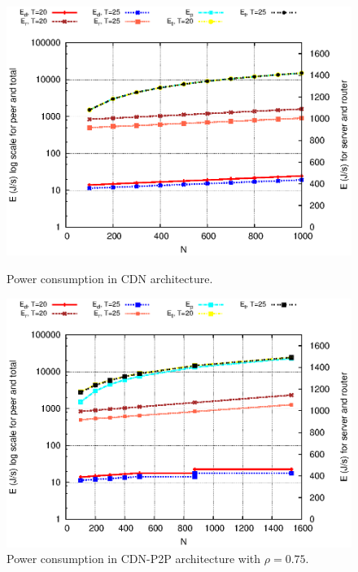 \documentclass[conference]{IEEEtran}
\begin{document}
\begin{figure}[htp!]
\centering
\begin{minipage}[b]{0.4\linewidth}
	\includegraphics[scale=0.6]{graphs/cdn.eps}
	\caption{Power consumption in CDN architecture.}
	\label{fig:4-0}
\end{minipage}
\hfill
\begin{minipage}[b]{0.4\linewidth}
	\includegraphics[scale=0.6]{graphs/cdnp2p-3.eps}
	\caption{Power consumption in CDN-P2P architecture with $\rho=0.75$.}
	\label{fig:4-3}
\end{minipage}
\label{fig:main}
\end{figure}
\end{document}
